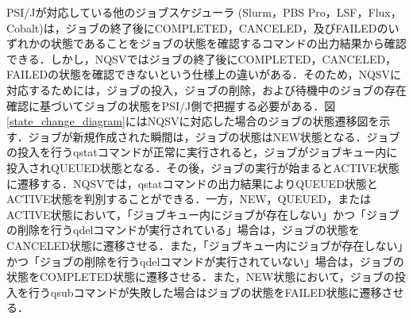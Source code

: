 PSI/Jが対応している他のジョブスケジューラ (Slurm\cite{Slurm}，PBS Pro\cite{PBS_Pro}，LSF\cite{LSF}，Flux\cite{Flux}，Cobalt\cite{Cobalt})は，ジョブの終了後にCOMPLETED，CANCELED，及びFAILEDのいずれかの状態であることをジョブの状態を確認するコマンドの出力結果から確認できる．しかし，NQSVではジョブの終了後にCOMPLETED，CANCELED，FAILEDの状態を確認できないという仕様上の違いがある．そのため，NQSVに対応するためには，ジョブの投入，ジョブの削除，および待機中のジョブの存在確認に基づいてジョブの状態をPSI/J側で把握する必要がある．図\ref{state_change_diagram}にはNQSVに対応した場合のジョブの状態遷移図を示す．ジョブが新規作成された瞬間は，ジョブの状態はNEW状態となる．ジョブの投入を行うqstatコマンドが正常に実行されると，ジョブがジョブキュー内に投入されQUEUED状態となる．その後，ジョブの実行が始まるとACTIVE状態に遷移する．NQSVでは，qstatコマンドの出力結果によりQUEUED状態とACTIVE状態を判別することができる．一方，NEW，QUEUED，またはACTIVE状態において，「ジョブキュー内にジョブが存在しない」かつ「ジョブの削除を行うqdelコマンドが実行されている」場合は，ジョブの状態をCANCELED状態に遷移させる．また，「ジョブキュー内にジョブが存在しない」かつ「ジョブの削除を行うqdelコマンドが実行されていない」場合は，ジョブの状態をCOMPLETED状態に遷移させる．また，NEW状態において，ジョブの投入を行うqsubコマンドが失敗した場合はジョブの状態をFAILED状態に遷移させる．\par
